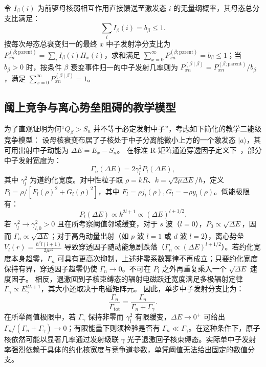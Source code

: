 令 $I_\beta(i)$ 为前驱母核弱相互作用直接馈送至激发态 $i$ 的无量纲概率，其母态总分支比满足：
\begin{equation}\label{eq:appD-ibeta-sum}
\sum_{i} I_\beta(i) = b_\beta \le 1.
\end{equation}
按每次母态总衰变归一的最终 $x$ 中子发射净分支比为 $P_{xn}^{(\beta;\mathrm{parent})} = \sum_{i} I_\beta(i) \Pi_x(i)$，求和满足 $\sum_{x=0}^\infty P_{xn}^{(\beta;\mathrm{parent})} = b_\beta \le 1$；当 $b_\beta>0$ 时，按条件 $\beta$ 衰变事件归一的中子发射几率则为 $P_{xn}^{(\beta\mid\beta)} = P_{xn}^{(\beta;\mathrm{parent})} / b_\beta$，满足 $\sum_{x=0}^\infty P_{xn}^{(\beta\mid\beta)} = 1$。

\subsection{阈上竞争与离心势垒阻碍的教学模型}

为了直观证明为何“$Q_\beta > S_n$ 并不等于必定发射中子”，考虑如下简化的教学二能级竞争模型：
设母核衰变布居了子核处于中子分离能微小上方的一个激发态 $|a\rangle$，其可用出射中子动能为 $\Delta E = E_x - S_n$。
在标准 R-矩阵通道穿透因子定义下~\cite{book-bertulani-nuclear-reactions}，部分中子发射宽度为：
\begin{equation}\label{eq:appD-neutron-width-scaling}
\Gamma_n(\Delta E) = 2 \gamma_l^2 P_l(\Delta E),
\end{equation}
其中 $\gamma_l^2$ 为道约化宽度。对中性粒子取 $\rho=kR$、$k=\sqrt{2\mu\Delta E}/\hbar$，定义 $P_l=\rho/[F_l(\rho)^2+G_l(\rho)^2]$，其中 $F_l=\rho j_l(\rho),G_l=-\rho y_l(\rho)$。低能极限有：
\begin{equation}\label{eq:appD-centrifugal-suppression}
P_l(\Delta E) \propto k^{2l+1} \propto (\Delta E)^{l + 1/2}.
\end{equation}
若 $\gamma_l^2\to\gamma_{l,0}^2>0$ 且在所考察阈值邻域缓变，对于 $s$ 波（$l=0$），$P_0 \propto \sqrt{\Delta E}$，因而 $\Gamma_n \propto \sqrt{\Delta E}$；对于高角动量出射（如 $p$ 波 $l=1$ 或 $d$ 波 $l=2$），离心势垒 $V_l(r) = \frac{\hbar^2 l(l+1)}{2\mu r^2}$ 导致穿透因子随动能急剧跌落（$\Gamma_n \propto (\Delta E)^{l+1/2}$）。若约化宽度本身趋零，$\Gamma_n$ 可具有更高次抑制，上述非零系数幂律不再成立；只要约化宽度保持有界，穿透因子趋零仍使 $\Gamma_n\to0$。不可在 $P_l$ 之外再重复乘入一个 $\sqrt{\Delta E}$ 速度因子。
相反，退激回到子核束缚态的辐射电磁跃迁宽度满足多极辐射定律 $\Gamma_\gamma \propto E_\gamma^{2\lambda + 1}$，其大小还取决于电磁矩阵元。
因此，单步中子发射分支比为：
\begin{equation}\label{eq:appD-branch-competition}
\frac{\Gamma_n}{\Gamma_{\mathrm{tot}}} = \frac{\Gamma_n}{\Gamma_n + \Gamma_\gamma}.
\end{equation}
在所举阈值极限中，若 $\Gamma_\gamma$ 保持非零而 $\gamma_l^2$ 有限缓变，$\Delta E\to0^+$ 可给出 $\Gamma_n/ (\Gamma_n+\Gamma_\gamma)\to0$；有限能量下则须检验是否有 $\Gamma_n \ll \Gamma_\gamma$。在这种条件下，原子核依然可能以显著几率通过发射级联 $\gamma$ 光子退激回子核束缚态。实际单中子发射率强烈依赖于具体的约化核宽度与竞争道参数，单凭阈值无法给出固定的数值分支。

